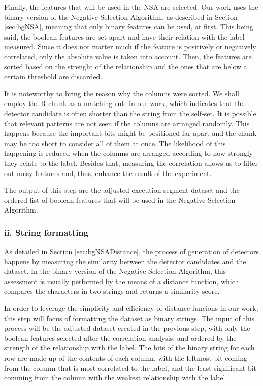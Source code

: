 Finally, the features that will be used in the NSA are selected. Our work uses the binary version of the Negative Selection Algorithm, as described in Section \ref{sec:bgNSA}, meaning that only binary features can be used, at first. This being said, the boolean features are set apart and have their relation with the label measured. Since it does not matter much if the feature is positively or negatively correlated, only the absolute value is taken into account. Then, the features are sorted based on the strenght of the relationship and the ones that are below a certain threshold are discarded.

It is noteworthy to bring the reason why the columns were sorted. We shall employ the R-chunk as a matching rule in our work, which indicates that the detector candidate is often shorter than the string from the self-set. It is possible that relevant patterns are not seen if the columns are arranged randomly. This happens because the important bits might be positioned far apart and the chunk may be too short to consider all of them at once. The likelihood of this happening is reduced when the columns are arranged according to how strongly they relate to the label. Besides that, measuring the correlation allows us to filter out noisy features and, thus, enhance the result of the experiment.

The output of this step are the adjusted execution segment dataset and the ordered list of boolean features that will be used in the Negative Selection Algorithm. 

\subsubsection{ii. String formatting}

As detailed in Section \ref{sec:bgNSADistance}, the process of generation of detectors happens by measuring the similarity between the detector candidates and the dataset. In the binary version of the Negative Selection Algorithm, this assessment is usually performed by the means of a distance function, which compares the characters in two strings and returns a similarity score. 

In order to leverage the simplicity and efficiency of distance funcions in our work, this step will focus of formatting the dataset as binary strings. The input of this process will be the adjusted dataset created in the previous step, with only the boolean features selected after the correlation analysis, and ordered by the strength of the relationship with the label. The bits of the binary string for each row are made up of the contents of each column, with the leftmost bit coming from the column that is most correlated to the label, and the least significant bit comming from the column with the weakest relationship with the label.

